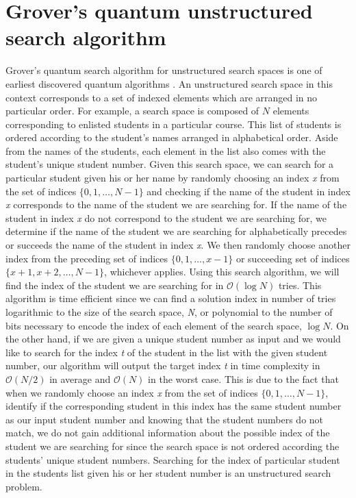 \section{Grover's quantum unstructured search algorithm}
Grover's quantum search algorithm for unstructured search spaces is one of earliest discovered quantum algorithms \cite{Grover1997}. An unstructured search space in this context corresponds to a set of indexed elements which are arranged in no particular order. For example, a search space is composed of $\textit{N}$ elements corresponding to enlisted students in a particular course. This list of students is ordered according to the student's names arranged in alphabetical order. Aside from the names of the students, each element in the list also comes with the student's unique student number. Given this search space, we can search for a particular student given his or her name by randomly choosing an index \textit{x} from the set of indices $\{0,1,\ldots,N-1\}$ and checking if the name of the student in index \textit{x} corresponds to the name of the student we are searching for. If the name of the student in index \textit{x} do not correspond to the student we are searching for, we determine if the name of the student we are searching for alphabetically precedes or succeeds the name of the student in index \textit{x}. We then randomly choose another index from the preceding set of indices $\{0,1,\ldots,x-1\}$ or succeeding set of indices $\{x+1,x+2,\ldots,N-1\}$, whichever applies. Using this search algorithm, we will find the index of the student we are searching for in $\mathcal{O}\left(\log N\right)$ tries. This algorithm is time efficient since we can find a solution index in number of tries logarithmic to the size of the search space, \textit{N}, or polynomial to the number of bits necessary to encode the index of each element of the search space, $\log N$. On the other hand, if we are given a unique student number as input and we would like to search for the index \textit{t} of the student in the list with the given student number, our algorithm will output the target index \textit{t} in time complexity in $\mathcal{O}(N/2)$ in average and $\mathcal{O}(N)$ in the worst case. This is due to the fact that when we randomly choose an index \textit{x} from the set of indices $\{0,1,\ldots,N-1\}$, identify if the corresponding student in this index has the same student number as our input student number and knowing that the student numbers do not match, we do not gain additional information about the possible index of the student we are searching for since the search space is not ordered according the students' unique student numbers. Searching for the index of particular student in the students list given his or her student number is an unstructured search problem.

